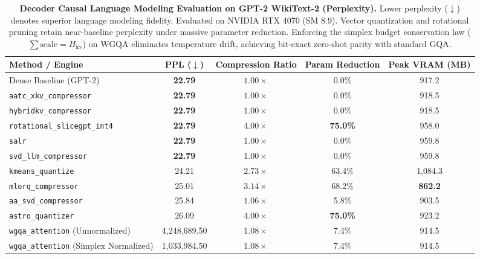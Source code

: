\begin{table}[t]
\centering
\caption{\textbf{Decoder Causal Language Modeling Evaluation on GPT-2 WikiText-2 (Perplexity).}
Lower perplexity ($\downarrow$) denotes superior language modeling fidelity. Evaluated on NVIDIA RTX 4070 (SM 8.9).
Vector quantization and rotational pruning retain near-baseline perplexity under massive parameter reduction.
Enforcing the simplex budget conservation law ($\sum \text{scale} = H_{\text{kv}}$) on WGQA eliminates temperature drift, achieving bit-exact zero-shot parity with standard GQA.}
\label{tab:decoder}
\small
\setlength{\tabcolsep}{4.5pt}
\begin{tabular}{lcccc}
\toprule
\textbf{Method / Engine} & \textbf{PPL ($\downarrow$)} & \textbf{Compression Ratio} & \textbf{Param Reduction} & \textbf{Peak VRAM (MB)} \\
\midrule
Dense Baseline (GPT-2) & \textbf{22.79} & $1.00\times$ & 0.0\% & 917.2 \\
\texttt{aatc\_xkv\_compressor} & \textbf{22.79} & $1.00\times$ & 0.0\% & 918.5 \\
\texttt{hybridkv\_compressor} & \textbf{22.79} & $1.00\times$ & 0.0\% & 918.5 \\
\texttt{rotational\_slicegpt\_int4} & \textbf{22.79} & $\mathbf{4.00\times}$ & \textbf{75.0\%} & 958.0 \\
\texttt{salr} & \textbf{22.79} & $1.00\times$ & 0.0\% & 959.8 \\
\texttt{svd\_llm\_compressor} & \textbf{22.79} & $1.00\times$ & 0.0\% & 959.8 \\
\texttt{kmeans\_quantize} & 24.21 & $2.73\times$ & 63.4\% & 1,084.3 \\
\texttt{mlorq\_compressor} & 25.01 & $3.14\times$ & 68.2\% & \textbf{862.2} \\
\texttt{aa\_svd\_compressor} & 25.84 & $1.06\times$ & 5.8\% & 903.5 \\
\texttt{astro\_quantizer} & 26.09 & $\mathbf{4.00\times}$ & \textbf{75.0\%} & 923.2 \\
\midrule
\texttt{wgqa\_attention} (Unnormalized) & 4,248,689.50 & $1.08\times$ & 7.4\% & 914.5 \\
\texttt{wgqa\_attention} (Simplex Normalized) & 1,033,984.50 & $1.08\times$ & 7.4\% & 914.5 \\
\bottomrule
\end{tabular}
\end{table}
